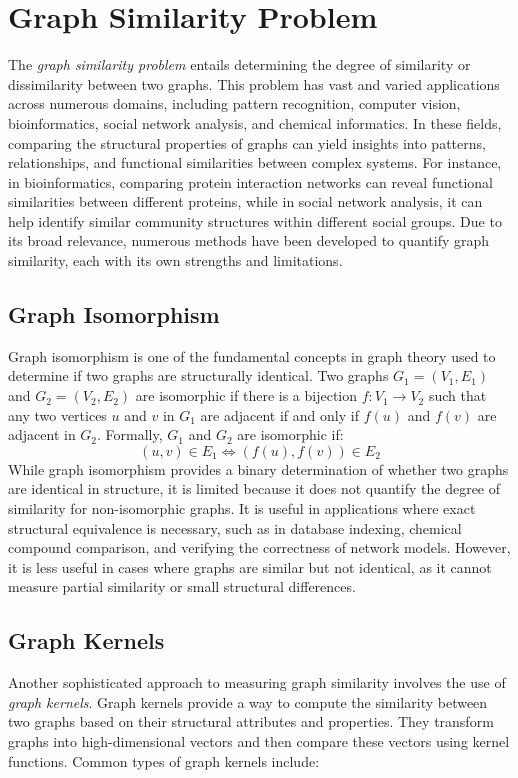 \documentclass[../Thesis.tex]{subfiles}
\begin{document}
	
	\section{Graph Similarity Problem}
	\label{sec:graph_similarity_problem}
	
	The \emph{graph similarity problem} entails determining the degree of similarity or dissimilarity between two graphs. This problem has vast and varied applications across numerous domains, including pattern recognition, computer vision, bioinformatics, social network analysis, and chemical informatics. In these fields, comparing the structural properties of graphs can yield insights into patterns, relationships, and functional similarities between complex systems. For instance, in bioinformatics, comparing protein interaction networks can reveal functional similarities between different proteins, while in social network analysis, it can help identify similar community structures within different social groups. Due to its broad relevance, numerous methods have been developed to quantify graph similarity, each with its own strengths and limitations.
	
	\subsection{Graph Isomorphism}
	Graph isomorphism is one of the fundamental concepts in graph theory used to determine if two graphs are structurally identical. Two graphs $G_1 = (V_1, E_1)$ and $G_2 = (V_2, E_2)$ are isomorphic if there is a bijection $f: V_1 \to V_2$ such that any two vertices $u$ and $v$ in $G_1$ are adjacent if and only if $f(u)$ and $f(v)$ are adjacent in $G_2$. Formally, $G_1$ and $G_2$ are isomorphic if:
	\[
	(u, v) \in E_1 \Leftrightarrow (f(u), f(v)) \in E_2
	\]
	While graph isomorphism provides a binary determination of whether two graphs are identical in structure, it is limited because it does not quantify the degree of similarity for non-isomorphic graphs. It is useful in applications where exact structural equivalence is necessary, such as in database indexing, chemical compound comparison, and verifying the correctness of network models. However, it is less useful in cases where graphs are similar but not identical, as it cannot measure partial similarity or small structural differences.
	
	\subsection{Graph Kernels}
	Another sophisticated approach to measuring graph similarity involves the use of \emph{graph kernels}. Graph kernels provide a way to compute the similarity between two graphs based on their structural attributes and properties. They transform graphs into high-dimensional vectors and then compare these vectors using kernel functions. Common types of graph kernels include:
	
\end{document}
